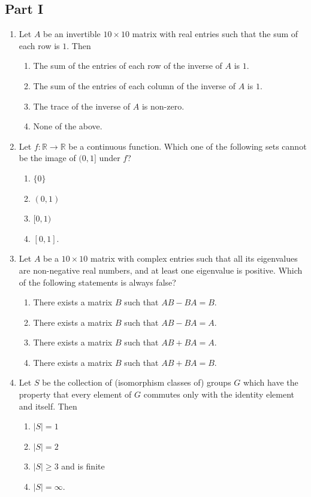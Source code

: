\documentclass[11pt, a4paper]{article}
\begin{document}
\subsection*{Part I}
\begin{enumerate}
  \item Let $A$ be an invertible $10 \times 10$ matrix with real entries such that the sum of each row is $1$. Then
  \begin{enumerate}[label=\Alph*.]
    \item The sum of the entries of each row of the inverse of $A$ is $1$.
    \item The sum of the entries of each column of the inverse of $A$ is $1$.
    \item The trace of the inverse of $A$ is non-zero.
    \item None of the above.
  \end{enumerate}

  \item Let $f: \mathbb{R} \to \mathbb{R}$ be a continuous function. Which one of the following sets cannot be the image of $(0, 1]$ under $f$?
  \begin{enumerate}[label=\Alph*.]
    \item $\{0\}$
    \item $(0, 1)$
    \item $[0, 1)$
    \item $[0, 1]$.
  \end{enumerate}

  \item Let $A$ be a $10 \times 10$ matrix with complex entries such that all its eigenvalues are non-negative real numbers, and at least one eigenvalue is positive. Which of the following statements is always false?
  \begin{enumerate}[label=\Alph*.]
    \item There exists a matrix $B$ such that $AB - BA = B$.
    \item There exists a matrix $B$ such that $AB - BA = A$.
    \item There exists a matrix $B$ such that $AB + BA = A$.
    \item There exists a matrix $B$ such that $AB + BA = B$.
  \end{enumerate}

  \item Let $S$ be the collection of (isomorphism classes of) groups $G$ which have the property that every element of $G$ commutes only with the identity element and itself. Then
  \begin{enumerate}[label=\Alph*.]
    \item $|S| = 1$
    \item $|S| = 2$
    \item $|S| \ge 3$ and is finite
    \item $|S| = \infty$.
  \end{enumerate}


\end{enumerate}
\end{document}
